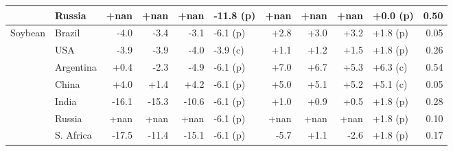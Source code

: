 \begin{tabular}{llrrrlrrrlr}
 & Russia & +nan & +nan & +nan & -11.8 (p) & +nan & +nan & +nan & +0.0 (p) & 0.50\\
\midrule
Soybean & Brazil & -4.0 & -3.4 & -3.1 & -6.1 (p) & +2.8 & +3.0 & +3.2 & +1.8 (p) & 0.05\\
 & USA & -3.9 & -3.9 & -4.0 & -3.9 (c) & +1.1 & +1.2 & +1.5 & +1.8 (p) & 0.26\\
 & Argentina & +0.4 & -2.3 & -4.9 & -6.1 (p) & +7.0 & +6.7 & +5.3 & +6.3 (c) & 0.54\\
 & China & +4.0 & +1.4 & +4.2 & -6.1 (p) & +5.0 & +5.1 & +5.2 & +5.1 (c) & 0.05\\
 & India & -16.1 & -15.3 & -10.6 & -6.1 (p) & +1.0 & +0.9 & +0.5 & +1.8 (p) & 0.28\\
 & Russia & +nan & +nan & +nan & -6.1 (p) & +nan & +nan & +nan & +1.8 (p) & 0.10\\
 & S. Africa & -17.5 & -11.4 & -15.1 & -6.1 (p) & -5.7 & +1.1 & -2.6 & +1.8 (p) & 0.17\\
\bottomrule
\end{tabular}
